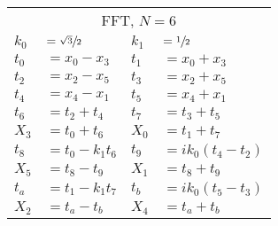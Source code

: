 \begin{tabular}{|p{4.3pt}l|p{4.3pt}l|}\toprule \multicolumn{4}{|c|}{FFT, $N=6$} \\
$k_0 $ &$= \sfrac{\sqrt{3}}{2}$ & $k_1 $ &$= \sfrac{1}{2}$\\ 
$t_0 $ &$= x_0 - x_3$ & $t_1 $ &$= x_0 + x_3$\\ 
$t_2 $ &$= x_2 - x_5$ & $t_3 $ &$= x_2 + x_5$\\ 
$t_4 $ &$= x_4 - x_1$ & $t_5 $ &$= x_4 + x_1$\\ 
$t_6 $ &$= t_2 + t_4$ & $t_7 $ &$= t_3 + t_5$\\ 
$X_3 $ &$= t_0 + t_6$ & $X_0 $ &$= t_1 + t_7$\\ 
$t_8 $ &$= t_0 - k_1t_6$ & $t_9 $ &$= ik_0(t_4 - t_2)$\\ 
$X_5 $ &$= t_8 - t_9$ & $X_1 $ &$= t_8 + t_9$\\ 
$t_a $ &$= t_1 - k_1t_7$ & $t_b $ &$= ik_0(t_5 - t_3)$\\ 
$X_2 $ &$= t_a - t_b$ & $X_4 $ &$= t_a + t_b$\\ 
\bottomrule\end{tabular}
